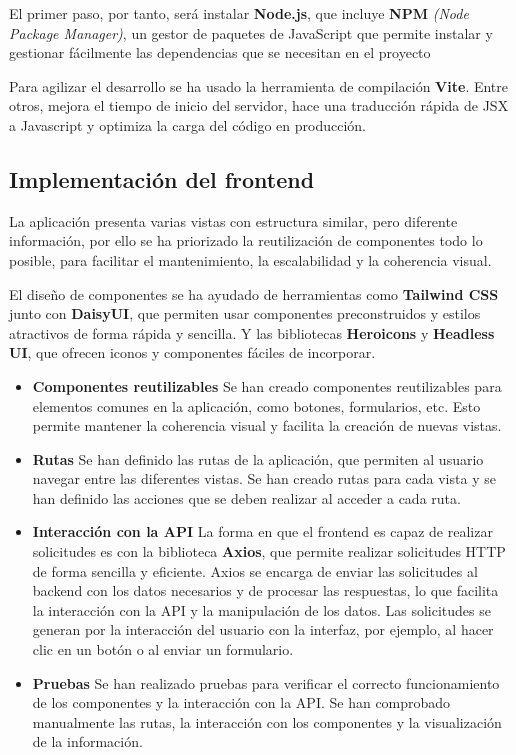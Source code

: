 El primer paso, por tanto, será instalar \textbf{Node.js}, que incluye \textbf{NPM} \textit{(Node Package Manager)}, un gestor de paquetes de JavaScript que permite instalar y gestionar  fácilmente las dependencias que se necesitan en el proyecto

Para agilizar el desarrollo se ha usado la herramienta de compilación \textbf{Vite}. Entre otros, mejora el tiempo de inicio del servidor, hace una traducción rápida de JSX a Javascript y optimiza la carga del código en producción.

\subsection{Implementación del frontend}
La aplicación presenta varias vistas con estructura similar, pero diferente información, por ello se ha priorizado la reutilización de componentes todo lo posible, para facilitar el mantenimiento, la escalabilidad y la coherencia visual.


El diseño de componentes se ha ayudado de herramientas como \textbf{Tailwind CSS} junto con \textbf{DaisyUI}, que permiten usar componentes preconstruidos y estilos atractivos de forma rápida y sencilla. Y las bibliotecas \textbf{Heroicons} y \textbf{Headless UI}, que ofrecen iconos y componentes fáciles de incorporar.


\begin{itemize}
    \item \textbf{Componentes reutilizables}
        Se han creado componentes reutilizables para elementos comunes en la aplicación, como botones, formularios, etc. Esto permite mantener la coherencia visual y facilita la creación de nuevas vistas.
    \item \textbf{Rutas}
        Se han definido las rutas de la aplicación, que permiten al usuario navegar entre las diferentes vistas. Se han creado rutas para cada vista y se han definido las acciones que se deben realizar al acceder a cada ruta.
    \item \textbf{Interacción con la API}
        La forma en que el frontend es capaz de realizar solicitudes es con la biblioteca \textbf{Axios}, que permite realizar solicitudes HTTP de forma sencilla y eficiente. Axios se encarga de enviar las solicitudes al backend con los datos necesarios y de procesar las respuestas, lo que facilita la interacción con la API y la manipulación de los datos. Las solicitudes se generan por la interacción del usuario con la interfaz, por ejemplo, al hacer clic en un botón o al enviar un formulario.
    \item \textbf{Pruebas}
        Se han realizado pruebas para verificar el correcto funcionamiento de los componentes y la interacción con la API. Se han comprobado manualmente las rutas, la interacción con los componentes y la visualización de la información.
\end{itemize}


